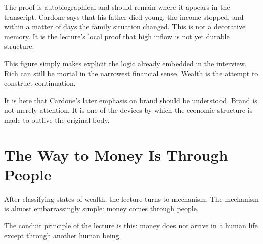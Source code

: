 The proof is autobiographical and should remain where it appears in the transcript. Cardone says that his father died young, the income stopped, and within a matter of days the family situation changed. This is not a decorative memory. It is the lecture's local proof that high inflow is not yet durable structure.

\begin{figure}[h]
\centering
{}
\end{figure}

This figure simply makes explicit the logic already embedded in the interview. Rich can still be mortal in the narrowest financial sense. Wealth is the attempt to construct continuation.

It is here that Cardone's later emphasis on brand should be understood. Brand is not merely attention. It is one of the devices by which the economic structure is made to outlive the original body.

\section{The Way to Money Is Through People}

After classifying states of wealth, the lecture turns to mechanism. The mechanism is almost embarrassingly simple: money comes through people.

\begin{definition}
The conduit principle of the lecture is this: money does not arrive in a human life except through another human being.
\end{definition}


